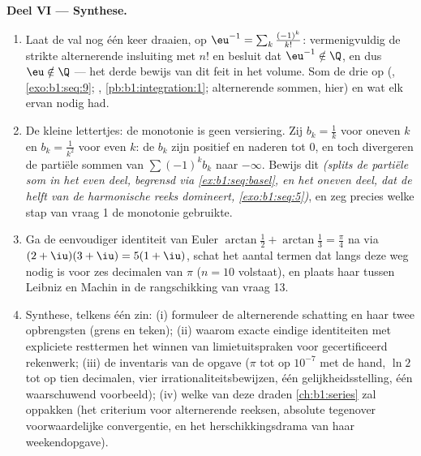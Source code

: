 \begin{problem}
\medskip
\noindent\textbf{Deel VI --- Synthese.}
\begin{enumerate}[resume]
  \item Laat de val nog één keer draaien, op $\eu^{-1} = \sum_k
        \frac{(-1)^k}{k!}$: vermenigvuldig de strikte
        alternerende insluiting met $n!$ en besluit dat $\eu^{-1}
        \notin \Q$, en dus $\eu \notin \Q$ --- het derde bewijs
        van dit feit in het volume. Som de drie op (, \cref{exo:b1:seq:9}; ,
        \cref{pb:b1:integration:1}; alternerende sommen, hier) en
        wat elk ervan nodig had.
  \item De kleine lettertjes: de monotonie is geen versiering.
        Zij $b_k = \frac1k$ voor oneven $k$ en $b_k =
        \frac{1}{k^2}$ voor even $k$: de $b_k$ zijn positief en
        naderen tot $0$, en toch divergeren de partiële sommen
        van $\sum (-1)^k b_k$ naar $-\infty$. Bewijs dit
        \emph{(splits de partiële som in het even deel, begrensd
        via \cref{ex:b1:seq:basel}, en het oneven deel, dat de
        helft van de harmonische reeks domineert,
        \cref{exo:b1:seq:5})}, en zeg precies welke stap van
        vraag 1 de monotonie gebruikte.
  \item Ga de eenvoudiger identiteit van Euler $\arctan\frac12 +
        \arctan\frac13 = \frac\pi4$ na via $(2 + \iu)(3 + \iu) =
        5(1 + \iu)$, schat het aantal termen dat langs deze weg
        nodig is voor zes decimalen van $\pi$ ($n = 10$
        volstaat), en plaats haar tussen Leibniz en Machin in de
        rangschikking van vraag 13.
  \item Synthese, telkens één zin: (i) formuleer de alternerende
        schatting en haar twee opbrengsten (grens en teken); (ii)
        waarom exacte eindige identiteiten met expliciete
        resttermen het winnen van limietuitspraken voor
        gecertificeerd rekenwerk; (iii) de inventaris van de
        opgave ($\pi$ tot op $10^{-7}$ met de hand, $\ln 2$ tot
        op tien decimalen, vier irrationaliteitsbewijzen, één
        gelijkheidsstelling, één waarschuwend voorbeeld); (iv)
        welke van deze draden \cref{ch:b1:series} zal oppakken
        (het criterium voor alternerende reeksen, absolute
        tegenover voorwaardelijke convergentie, en het
        herschikkingsdrama van haar weekendopgave).
\end{enumerate}
\end{problem}
